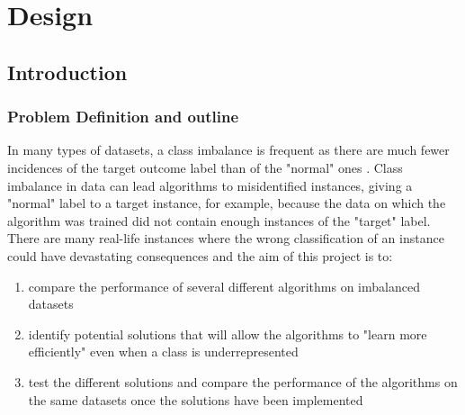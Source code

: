 \chapter{Design}\label{ch:Design}

\section{Introduction}
\subsection{Problem Definition and outline}
In many types of datasets, a class imbalance is frequent as there are much fewer incidences of the target outcome label than of the "normal" ones . Class imbalance in data  can lead algorithms to misidentified instances, giving a "normal" label to a target instance, for example, because the data on which the algorithm was trained did not contain enough instances of the "target" label.  There are many real-life instances where the wrong classification of an instance could have devastating consequences and the aim of this project is to:
\begin{enumerate}
\item compare the performance of several different algorithms on imbalanced datasets
\item identify potential solutions that will allow the algorithms to "learn more efficiently" even when a class is underrepresented
\item test the different solutions and compare the performance of the algorithms on the same datasets once the solutions have been implemented
\end{enumerate}
